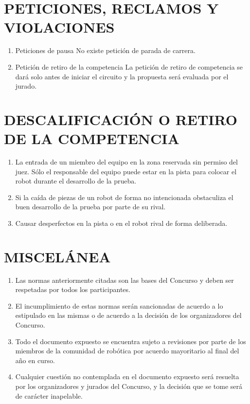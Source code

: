 \documentclass{article}
\begin{document}
\section{PETICIONES, RECLAMOS Y VIOLACIONES}

\begin{enumerate}
\item Peticiones de pausa
No existe petición de parada de carrera.
\item Petición de retiro de la competencia
La petición de retiro de competencia se dará solo antes de iniciar el
circuito y la propuesta será evaluada por el jurado.
\end{enumerate}

\section{DESCALIFICACIÓN O RETIRO DE LA COMPETENCIA}

\begin{enumerate}
\item La entrada de un miembro del equipo en la zona reservada sin permiso del
juez. Sólo el responsable del equipo puede estar en la pista para colocar el
robot durante el desarrollo de la prueba.
\item Si la caída de piezas de un robot de forma no intencionada obstaculiza el
buen desarrollo de la prueba por parte de su rival.
\item Causar desperfectos en la pista o en el robot rival de forma deliberada.
\end{enumerate}

\section{MISCELÁNEA}

\begin{enumerate}
\item Las  normas  anteriormente  citadas  son  las  bases  del  Concurso  y  deben  ser respetadas por todos los participantes.
\item El incumplimiento de estas normas serán sancionadas de acuerdo a lo estipulado en las mismas o de acuerdo a la decisión de los organizadores del Concurso.
\item Todo  el  documento  expuesto  se  encuentra  sujeto  a  revisiones  por  parte  de los miembros    de la comunidad de robótica por acuerdo mayoritario al final del año en curso.
\item Cualquier cuestión no contemplada en el documento expuesto será resuelta por los organizadores y jurados del Concurso, y la decisión que se tome será de carácter inapelable.
\end{enumerate}
\end{document}
